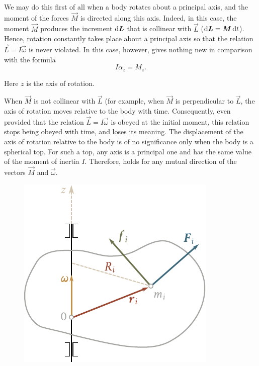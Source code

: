 We may do this first of all when a body rotates about a principal axis, and the moment of the forces $\vec{M}$ is directed along this axis. Indeed, in this case, the moment $\vec{M}$ produces the increment $\mathrm{d}\boldsymbol{L}$ that is collinear with $\vec{L}$ ($\mathrm{d}\boldsymbol{L}=\boldsymbol{M}\,\mathrm{d} t$). Hence, rotation constantly takes place about a principal axis so that the relation $\vec{L}=I\vec{\omega}$ is never violated. In this case, however,  gives nothing new in comparison with the formula
\begin{equation}\label{eq:5_45}
	I\alpha_z = M_z.
\end{equation}

\noindent
Here $z$ is the axis of rotation.

When $\vec{M}$ is not collinear with $\vec{L}$ (for example, when $\vec{M}$ is perpendicular to $\vec{L}$, the axis of rotation moves relative to the body with time. Consequently, even provided that the relation $\vec{L}=I\vec{\omega}$ is obeyed at the initial moment, this relation stops being obeyed with time, and  loses its meaning. The displacement of the axis of rotation relative to the body is of no significance only when the body is a spherical top. For such a top, any axis is a principal one and has the same value of the moment of inertia $I$. Therefore,  holds for any mutual direction of the vectors $\vec{M}$ and $\vec{\omega}$.

\begin{figure}[t]
	\begin{center}
		\includegraphics[scale=1]{figures/ch_05/fig_5_19.pdf}
		\caption[]{}
		\label{fig:5_19}
	\end{center}
	\vspace{-0.6cm}
\end{figure}

